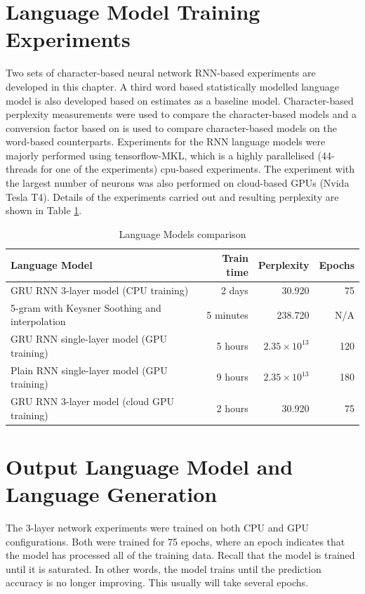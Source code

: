 \section{Language Model Training Experiments}
Two sets of character-based neural network RNN-based experiments are developed in this chapter.  A third word based statistically modelled language model is also developed based on  \cite{Heafield-estimate} estimates as a baseline model. Character-based perplexity measurements were used to compare the character-based models and a conversion factor based on \citep{hwang2017character} is used to compare character-based models on the word-based counterparts.  Experiments for the RNN language models were majorly performed using tensorflow-MKL, which is a highly parallelised (44-threads for one of the experiments) cpu-based experiments.  The experiment with the largest number of neurons was also performed on cloud-based GPUs (Nvida Tesla T4).  Details of the experiments carried out and resulting perplexity are shown in Table \ref{tab6_1:LMX}.

\begin{table}
  \caption{Language Models comparison}
  \label{tab6_1:LMX}
\begin{tabular}{lrrr}
\toprule
Language Model & Train time & Perplexity & Epochs  \\
\midrule
GRU RNN 3-layer model (CPU training) & ~ 2 days & 30.920 & 75 \\
5-gram with Keysner Soothing and interpolation & 5 minutes & 238.720 & N/A \\
GRU RNN single-layer model (GPU training) & ~ 5 hours & $2.35\times10^{13}$ & 120 \\
Plain RNN single-layer model (GPU training) & ~ 9 hours & $2.35\times10^{13}$ & 180 \\
GRU RNN 3-layer model (cloud GPU training) & ~ 2 hours & 30.920 & 75 \\
\bottomrule
\end{tabular}
\end{table}

\stopblue


\section{Output Language Model and Language Generation}\label{sec6_4}
\startblue
The 3-layer network experiments were trained on both CPU and GPU configurations. Both were trained for 75 epochs, where an epoch indicates that the model has processed all of the training data.  Recall that the model  is trained until it is saturated.  In other words, the model trains until the prediction accuracy is no longer improving.   This usually will take several epochs.

